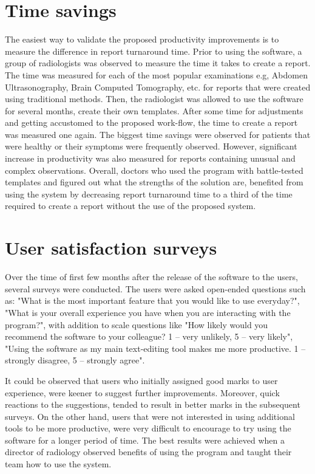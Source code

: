 \documentclass[12pt, twoside, openany]{report}
\theoremstyle{definition}
\begin{document}
\section{Time savings}
The easiest way to validate the proposed productivity improvements is to measure the difference in report turnaround time. Prior to using the software, a group of radiologists was observed to measure the time it takes to create a report. The time was measured for each of the most popular examinations e.g, Abdomen Ultrasonography, Brain Computed Tomography, etc. for reports that were created using traditional methods. Then, the radiologist was allowed to use the software for several months, create their own templates. After some time for adjustments and getting accustomed to the proposed work-flow, the time to create a report was measured one again. The biggest time savings were observed for patients that were healthy or their symptoms were frequently observed. However, significant increase in productivity was also measured for reports containing unusual and complex observations. Overall, doctors who used the program with battle-tested templates and figured out what the strengths of the solution are, benefited from using the system by decreasing report turnaround time to a third of the time required to create a report without the use of the  proposed system. 

\section{User satisfaction surveys}
Over the time of first few months after the release of the software to the  users, several surveys were conducted. The users were asked open-ended questions such as: "What is the most important feature that you would like to use everyday?", "What is your overall experience you have when you are interacting with the program?", with addition to scale questions like "How likely would you recommend the software to your colleague? 1 – very unlikely, 5 – very likely", "Using the software as my main text-editing tool makes me more productive. 1 – strongly disagree, 5 – strongly agree".

It could be observed that users who initially assigned good marks to user experience, were keener to suggest further improvements. Moreover, quick reactions to the suggestions, tended to result in better marks in the subsequent surveys. On the other hand, users that were not interested in using additional tools to be more productive, were very difficult to encourage to try using the software for a longer period of time. The best results were achieved when a director of radiology observed benefits of using the program and taught their team how to use the system.
\end{document}
